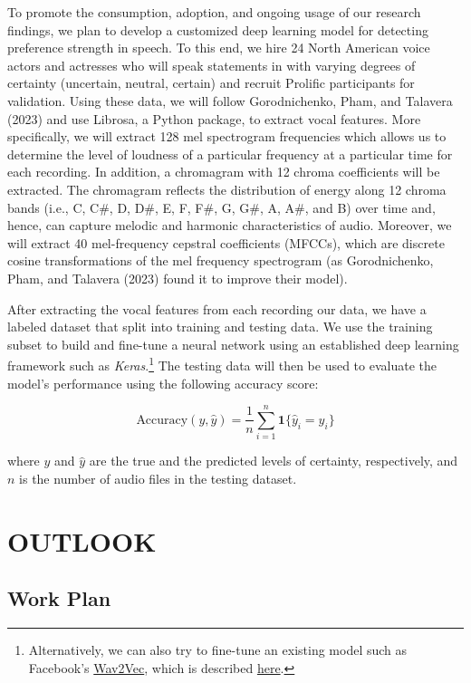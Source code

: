 \documentclass[
  a4paper,
]{scrreprt}
\begin{document}
To promote the consumption, adoption, and ongoing usage of our research
findings, we plan to develop a customized deep learning model for
detecting preference strength in speech. To this end, we hire 24 North
American voice actors and actresses who will speak statements in with
varying degrees of certainty (uncertain, neutral, certain) and recruit
Prolific participants for validation. Using these data, we will follow
Gorodnichenko, Pham, and Talavera (2023) and use Librosa, a Python
package, to extract vocal features. More specifically, we will extract
128 mel spectrogram frequencies which allows us to determine the level
of loudness of a particular frequency at a particular time for each
recording. In addition, a chromagram with 12 chroma coefficients will be
extracted. The chromagram reflects the distribution of energy along 12
chroma bands (i.e., C, C\#, D, D\#, E, F, F\#, G, G\#, A, A\#, and B)
over time and, hence, can capture melodic and harmonic characteristics
of audio. Moreover, we will extract 40 mel-frequency cepstral
coefficients (MFCCs), which are discrete cosine transformations of the
mel frequency spectrogram (as Gorodnichenko, Pham, and Talavera (2023)
found it to improve their model).

After extracting the vocal features from each recording our data, we
have a labeled dataset that split into training and testing data. We use
the training subset to build and fine-tune a neural network using an
established deep learning framework such as \emph{Keras}.\footnote{Alternatively,
  we can also try to fine-tune an existing model such as Facebook's
  \href{https://huggingface.co/facebook/wav2vec2-base}{Wav2Vec}, which
  is described
  \href{https://huggingface.co/docs/transformers/en/tasks/audio_classification}{here}.}
The testing data will then be used to evaluate the model's performance
using the following accuracy score:

\[
\text{Accuracy}(y, \hat{y}) = \frac{1}{n} \sum_{i=1}^n \mathbf{1}\{\hat{y}_i = y_i\}
\]

where \(y\) and \(\hat{y}\) are the true and the predicted levels of
certainty, respectively, and \(n\) is the number of audio files in the
testing dataset.

\part{OUTLOOK}

\hypertarget{work-plan}{%
\chapter{Work Plan}\label{work-plan}}
\end{document}
